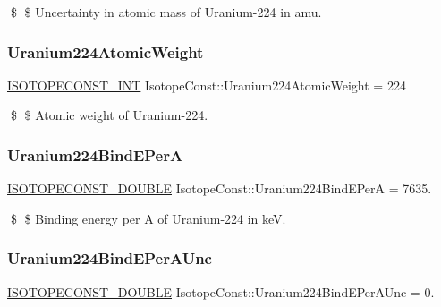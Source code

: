 \$ \$ Uncertainty in atomic mass of Uranium-\/224 in amu. \mbox{\label{group___isotope_const-_uranium-_u224_ga92b55c5ea4ae8e129e4dd3b92482317a}} 
\subsubsection{\texorpdfstring{Uranium224\+Atomic\+Weight}{Uranium224AtomicWeight}}
{\footnotesize\ttfamily \mbox{\hyperlink{group___isotope_const-_macros_ga5f18360b3e99483a35c32d789e62621c}{I\+S\+O\+T\+O\+P\+E\+C\+O\+N\+S\+T\+\_\+\+I\+NT}} Isotope\+Const\+::\+Uranium224\+Atomic\+Weight = 224}

\$ \$ Atomic weight of Uranium-\/224. \mbox{\label{group___isotope_const-_uranium-_u224_ga4ccc8e2c470cae3d41a1a4a144d6f164}} 
\subsubsection{\texorpdfstring{Uranium224\+Bind\+E\+PerA}{Uranium224BindEPerA}}
{\footnotesize\ttfamily \mbox{\hyperlink{group___isotope_const-_macros_ga8f45a7272ce02c0b4c65c44636ed719a}{I\+S\+O\+T\+O\+P\+E\+C\+O\+N\+S\+T\+\_\+\+D\+O\+U\+B\+LE}} Isotope\+Const\+::\+Uranium224\+Bind\+E\+PerA = 7635.}

\$ \$ Binding energy per A of Uranium-\/224 in keV. \mbox{\label{group___isotope_const-_uranium-_u224_ga18e5e5eeee91ea148e7a2b6ca338f0c9}} 
\subsubsection{\texorpdfstring{Uranium224\+Bind\+E\+Per\+A\+Unc}{Uranium224BindEPerAUnc}}
{\footnotesize\ttfamily \mbox{\hyperlink{group___isotope_const-_macros_ga8f45a7272ce02c0b4c65c44636ed719a}{I\+S\+O\+T\+O\+P\+E\+C\+O\+N\+S\+T\+\_\+\+D\+O\+U\+B\+LE}} Isotope\+Const\+::\+Uranium224\+Bind\+E\+Per\+A\+Unc = 0.}

